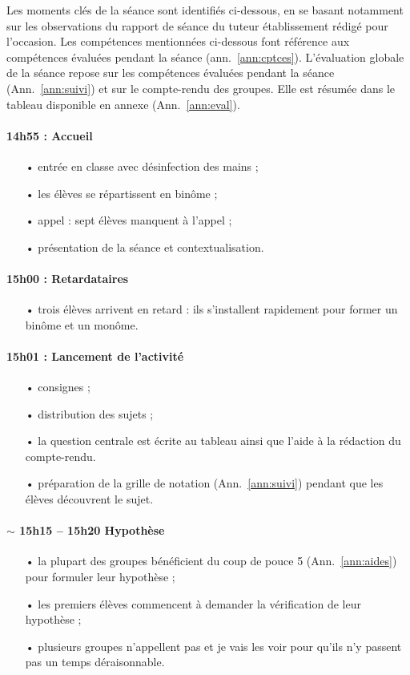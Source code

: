 \documentclass[12pt,a4paper, fleqn]{article}
\begin{document}
Les moments clés de la séance sont identifiés ci-dessous, en se basant notamment sur les observations du rapport de séance du tuteur établissement rédigé pour l'occasion.
Les compétences mentionnées ci-dessous font référence aux compétences évaluées pendant la séance (ann.~\ref{ann:cptces}).
L'évaluation globale de la séance repose sur les compétences évaluées pendant la séance (Ann.~\ref{ann:suivi}) et sur le compte-rendu des groupes.
Elle est résumée dans le tableau disponible en annexe (Ann.~\ref{ann:eval}).

\paragraph{14h55 : Accueil}
\begin{itemize}
\item[•] entrée en classe avec désinfection des mains ;
\item[•] les élèves se répartissent en binôme ;
\item[•] appel : sept élèves manquent à l'appel ;
\item[•] présentation de la séance et contextualisation.
\end{itemize}

\paragraph{15h00 : Retardataires}
\begin{itemize}
\item[•] trois élèves arrivent en retard : ils s'installent rapidement pour former un binôme et un monôme.
\end{itemize}

\paragraph{15h01 : Lancement de l'activité}
\begin{itemize}
\item[•] consignes ;
\item[•] distribution des sujets ;
\item[•] la question centrale est écrite au tableau ainsi que l'aide à la rédaction du compte-rendu.
\item[•] préparation de la grille de notation (Ann.~\ref{ann:suivi}) pendant que les élèves découvrent le sujet.
\end{itemize}

\paragraph{$\sim$ 15h15 -- 15h20 Hypothèse}
\begin{itemize}
\item[•] la plupart des groupes bénéficient du coup de pouce 5 (Ann.~\ref{ann:aides}) pour formuler leur hypothèse ;
\item[•] les premiers élèves commencent à demander la vérification de leur hypothèse ;
\item[•] plusieurs groupes n'appellent pas et je vais les voir pour qu'ils n'y passent pas un temps déraisonnable.
\end{itemize}
\end{document}
